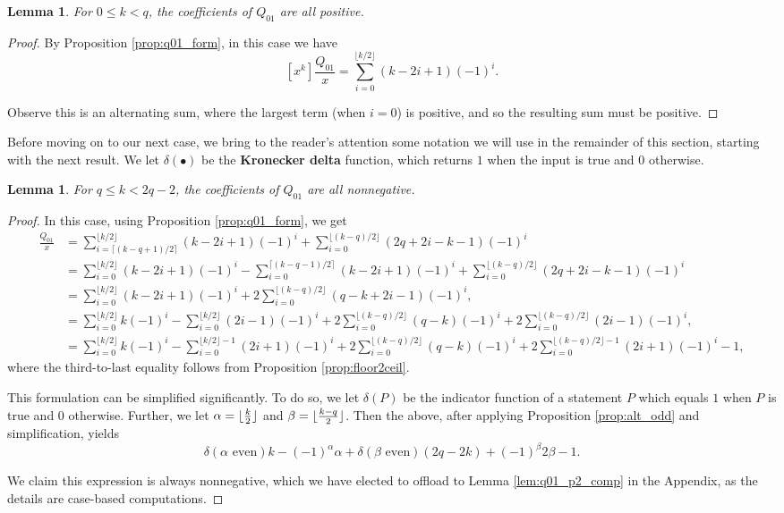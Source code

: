 \documentclass[11pt]{amsart}
\numberwithin{equation}{section}
\theoremstyle{plain}
\newtheorem{lemma}[equation]{Lemma}
\theoremstyle{definition}
\begin{document}
\begin{lemma}
For $0\leq k<q$, the coefficients of $Q_{01}$ are all positive. 
\end{lemma}
\begin{proof}
By Proposition \ref{prop:q01_form}, in this case we have 
$$[x^k]\frac{Q_{01}}{x}=\sum_{i=0}^{\lfloor {k/2}\rfloor}(k-2i+1)(-1)^i.$$

Observe this is an alternating sum, where the largest term (when $i=0$) is positive, and so the resulting sum must be positive.

\end{proof}

Before moving on to our next case, we bring to the reader's attention some notation we will use in the remainder of this section, starting with the next result. We let $\delta(\bullet)$ be the \textbf{Kronecker delta} function, which returns $1$ when the input is true and $0$ otherwise.
\begin{lemma}
For $q\leq k<2q-2$, the coefficients of $Q_{01}$ are all nonnegative. 
\end{lemma}
\begin{proof}
In this case, using Proposition \ref{prop:q01_form}, we get 
\begin{align*}
[x^k]\frac{Q_{01}}{x}&=\sum_{i=\lceil (k-q+1)/2\rceil}^{\lfloor {k/2}\rfloor}(k-2i+1)(-1)^i + \sum_{i=0}^{\lfloor(k-q)/2\rfloor}(2q+2i-k-1)(-1)^i\\
&=\sum_{i=0}^{\lfloor {k/2}\rfloor}(k-2i+1)(-1)^i -\sum_{i=0}^{
\lceil (k-q-1)/2\rceil}(k-2i+1)(-1)^i + \sum_{i=0}^{\lfloor(k-q)/2\rfloor}(2q+2i-k-1)(-1)^i\\
&=\sum_{i=0}^{\lfloor {k/2}\rfloor}(k-2i+1)(-1)^i + 2\sum_{i=0}^{\lfloor(k-q)/2\rfloor}(q-k+2i-1)(-1)^i,\\
&=\sum_{i=0}^{\lfloor {k/2}\rfloor}k(-1)^i-\sum_{i=0}^{\lfloor {k/2}\rfloor}(2i-1)(-1)^i + 2\sum_{i=0}^{\lfloor(k-q)/2\rfloor}(q-k)(-1)^i+ 2\sum_{i=0}^{\lfloor(k-q)/2\rfloor}(2i-1)(-1)^i,\\
&=\sum_{i=0}^{\lfloor {k/2}\rfloor}k(-1)^i-\sum_{i=0}^{\lfloor {k/2}\rfloor-1}(2i+1)(-1)^i + 2\sum_{i=0}^{\lfloor(k-q)/2\rfloor}(q-k)(-1)^i+ 2\sum_{i=0}^{\lfloor(k-q)/2\rfloor-1}(2i+1)(-1)^i-1,
\end{align*}
where the third-to-last equality follows from Proposition \ref{prop:floor2ceil}.

This formulation can be simplified significantly. To do so, we let $\delta(P)$ be the indicator function of a statement $P$ which equals $1$ when $P$ is true and $0$ otherwise. Further, we let $\alpha=\lfloor {k\over 2}\rfloor$ and $\beta=\lfloor{k-q\over 2}\rfloor$. Then the above, after applying Proposition \ref{prop:alt_odd} and simplification, yields 
$$
\delta(\alpha \text{ even}) k -(-1)^{\alpha}\alpha +\delta(\beta \text{ even})(2q-2k)+(-1)^\beta 2\beta -1
.$$

We claim this expression is always nonnegative, which we have elected to offload to Lemma \ref{lem:q01_p2_comp} in the Appendix, as the details are case-based computations. 


\end{proof}
\end{document}

